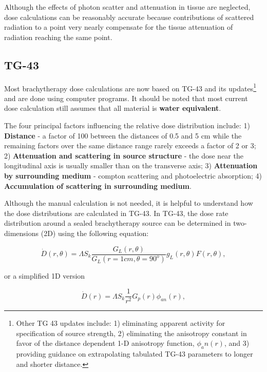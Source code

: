 \documentclass[]{book}
\let\rmarkdownfootnote\footnote%
\def\footnote{\protect\rmarkdownfootnote}
\theoremstyle{definition}
\theoremstyle{definition}
\theoremstyle{definition}
\theoremstyle{remark}
\begin{document}
Although the effects of photon scatter and attenuation in tissue are
neglected, dose calculations can be reasonably accurate because
contributions of scattered radiation to a point very nearly compensate
for the tissue attenuation of radiation reaching the same point.

\subsection{TG-43}\label{tg43}

Most brachytherapy dose calculations are now based on TG-43 and its
updates\footnote{Other TG 43 updates include: 1) eliminating apparent
  activity for specification of source strength, 2) eliminating the
  anisotropy constant in favor of the distance dependent 1-D anisotropy
  function, \(\phi_an(r)\), and 3) providing guidance on extrapolating
  tabulated TG-43 parameters to longer and shorter distance.} and are
done using computer programs. It should be noted that most current dose
calculation still assumes that all material is \textbf{water
equivalent}.

The four principal factors influencing the relative dose distribution
include: 1) \textbf{Distance} - a factor of 100 between the distances of
0.5 and 5 cm while the remaining factors over the same distance range
rarely exceeds a factor of 2 or 3; 2) \textbf{Attenuation and scattering
in source structure} - the dose near the longitudinal axis is usually
smaller than on the transverse axis; 3) \textbf{Attenuation by
surrounding medium} - compton scattering and photoelectric absorption;
4) \textbf{Accumulation of scattering in surrounding medium}.

Although the manual calculation is not needed, it is helpful to
understand how the dose distributions are calculated in TG-43. In TG-43,
the dose rate distribution around a sealed brachytherapy source can be
determined in two-dimensions (2D) using the following equation:

\begin{equation}
   \dot D(r, \theta) = \Lambda S_k \frac{G_L(r, \theta)}{G_L(r=1cm,\theta=90^o)} g_L(r, \theta) F(r,\theta),
   \label{eq:tg43}
\end{equation}

or a simplified 1D version

\begin{equation}
   \dot D(r) = \Lambda S_k \frac{1}{r^2} G_p(r)\phi_{an}(r),
   \label{eq:tg43-1D}
\end{equation}
\end{document}

